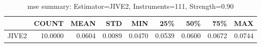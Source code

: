 \begin{table}[ht]
\centering
\caption{mse summary: Estimator=JIVE2, Instruments=111, Strength=0.90}
\begin{tabular}{lrrrrrrrr}
\toprule
 & COUNT & MEAN & STD & MIN & 25\% & 50\% & 75\% & MAX \\
\midrule
JIVE2 & 10.0000 & 0.0604 & 0.0089 & 0.0470 & 0.0539 & 0.0600 & 0.0672 & 0.0744 \\
\bottomrule
\end{tabular}
\end{table}
